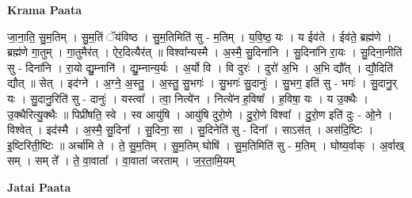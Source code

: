 \documentclass[17pt]{extarticle}
\begin{document}
\textbf{Krama Paata} \newline

जा॒ना॒ति॒ सु॒म॒तिम् । सु॒म॒तिं ॅय॑विष्ठ । सु॒म॒तिमिति॑ सु - म॒तिम् । य॒वि॒ष्ठ॒ यः । य ईव॑ते । ईव॑ते॒ ब्रह्म॑णे । ब्रह्म॑णे गा॒तुम् । गा॒तुमैर॑त् । ऐर॒दित्यैर॑त् ॥ विश्वा᳚न्यस्मै । अ॒स्मै॒ सु॒दिना॑नि । सु॒दिना॑नि रा॒यः । सु॒दिना॒नीति॑ सु - दिना॑नि । रा॒यो द्यु॒म्नानि॑ । द्यु॒म्नान्य॒र्यः । अ॒र्यो वि । वि दुरः॑ । दुरो॑ अ॒भि । अ॒भि द्यौ᳚त् । द्यौ॒दिति॑ द्यौत् ॥ सेत् । इद॑ग्ने । अ॒ग्ने॒ अ॒स्तु॒ । अ॒स्तु॒ सु॒भगः॑ । सु॒भगः॑ सु॒दानुः॑ । सु॒भग॒ इति॑ सु - भगः॑ । सु॒दानु॒र् यः । सु॒दानु॒रिति॑ सु - दानुः॑ । यस्त्वा᳚ । त्वा॒ नित्ये॑न । नित्ये॑न ह॒विषा᳚ । ह॒विषा॒ यः । य उ॒क्थैः । उ॒क्थैरित्यु॒क्थैः ॥ पिप्री॑षति॒ स्वे । स्व आयु॑षि । आयु॑षि दुरो॒णे । दु॒रो॒णे विश्वा᳚ । दु॒रो॒ण इति॑ दुः - ओ॒ने । विश्वेत् । इद॑स्मै । अ॒स्मै॒ सु॒दिना᳚ । सु॒दिना॒ सा । सु॒दिनेति॑ सु - दिना᳚ । साऽस॑त् । अस॑दि॒ष्टिः । इ॒ष्टिरिती॒ष्टिः ॥ अर्चा॑मि ते । ते॒ सु॒म॒तिम् । सु॒म॒तिम् घोषि॑ । सु॒म॒तिमिति॑ सु - म॒तिम् । घोष्य॒र्वाक् । अ॒र्वाख् सम् । सम् ते᳚ । ते॒ वा॒वाता᳚ । वा॒वाता॑ जरताम् । ज॒र॒ता॒मि॒यम् \newline

\textbf{Jatai Paata} \newline
\end{document}
